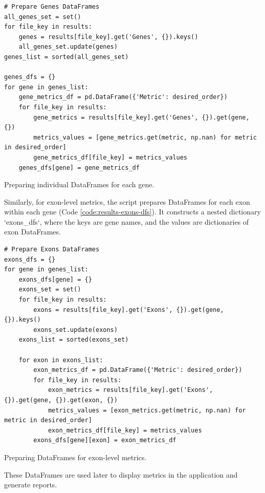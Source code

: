 \begin{longlisting}
\begin{verbatim}
# Prepare Genes DataFrames
all_genes_set = set()
for file_key in results:
    genes = results[file_key].get('Genes', {}).keys()
    all_genes_set.update(genes)
genes_list = sorted(all_genes_set)

genes_dfs = {}
for gene in genes_list:
    gene_metrics_df = pd.DataFrame({'Metric': desired_order})
    for file_key in results:
        gene_metrics = results[file_key].get('Genes', {}).get(gene, {})
        metrics_values = [gene_metrics.get(metric, np.nan) for metric in desired_order]
        gene_metrics_df[file_key] = metrics_values
    genes_dfs[gene] = gene_metrics_df
\end{verbatim}
\caption{Preparing individual DataFrames for each gene.}
\label{code:results-genes-dfs}
\end{longlisting}

Similarly, for exon-level metrics, the script prepares DataFrames for each exon within each gene (Code \ref{code:results-exons-dfs}). It constructs a nested dictionary `exons\_dfs`, where the keys are gene names, and the values are dictionaries of exon DataFrames.

\begin{longlisting}
\begin{verbatim}
# Prepare Exons DataFrames
exons_dfs = {}
for gene in genes_list:
    exons_dfs[gene] = {}
    exons_set = set()
    for file_key in results:
        exons = results[file_key].get('Exons', {}).get(gene, {}).keys()
        exons_set.update(exons)
    exons_list = sorted(exons_set)

    for exon in exons_list:
        exon_metrics_df = pd.DataFrame({'Metric': desired_order})
        for file_key in results:
            exon_metrics = results[file_key].get('Exons', {}).get(gene, {}).get(exon, {})
            metrics_values = [exon_metrics.get(metric, np.nan) for metric in desired_order]
            exon_metrics_df[file_key] = metrics_values
        exons_dfs[gene][exon] = exon_metrics_df
\end{verbatim}
\caption{Preparing DataFrames for exon-level metrics.}
\label{code:results-exons-dfs}
\end{longlisting}

These DataFrames are used later to display metrics in the application and generate reports.

